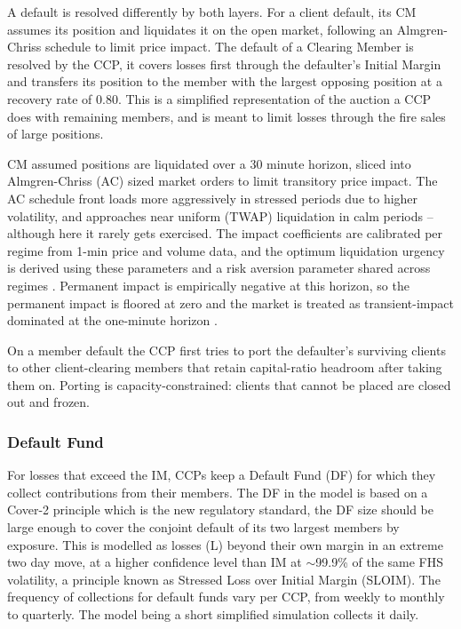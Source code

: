 A default is resolved differently by both layers. For a client default, its CM assumes its position and liquidates it on the open market, following an Almgren-Chriss schedule to limit price impact. The default of a Clearing Member is resolved by the CCP, it covers losses first through the defaulter's Initial Margin and transfers its position to the member with the largest opposing position at a recovery rate of 0.80. This is a simplified representation of the auction a CCP does with remaining members, and is meant to limit losses through the fire sales of large positions.

CM assumed positions are liquidated over a 30 minute horizon, sliced into Almgren-Chriss (AC) sized market orders to limit transitory price impact. The AC schedule front loads more aggressively in stressed periods due to higher volatility, and approaches near uniform (TWAP) liquidation in calm periods -- although here it rarely gets exercised. The impact coefficients are calibrated per regime from 1-min price and volume data, and the optimum liquidation urgency is derived using these parameters and a risk aversion parameter shared across regimes \citep{almgren_chriss_2000}. Permanent impact is empirically negative at this horizon, so the permanent impact is floored at zero and the market is treated as transient-impact
dominated at the one-minute horizon \citep{bouchaud_gefen_potters_wyart_2004}.

On a member default the CCP first tries to port the defaulter's surviving clients to other
client-clearing members that retain capital-ratio headroom after taking them on.
Porting is capacity-constrained: clients that cannot be placed are closed out and frozen.

\subsubsection{Default Fund}

For losses that exceed the IM, CCPs keep a Default Fund (DF) for which they collect contributions from their members. The DF in the model is based on a Cover-2 principle which is the new regulatory standard, the DF size should be large enough to cover the conjoint default of its two largest members by exposure. This is modelled as losses (L) beyond their own margin in an extreme two day move, at a higher confidence level than IM at $\sim$99.9\% of the same FHS volatility, a principle known as Stressed Loss over Initial Margin (SLOIM). The frequency of collections for default funds vary per CCP, from weekly to monthly to quarterly. The model being a short simplified simulation collects it daily.

